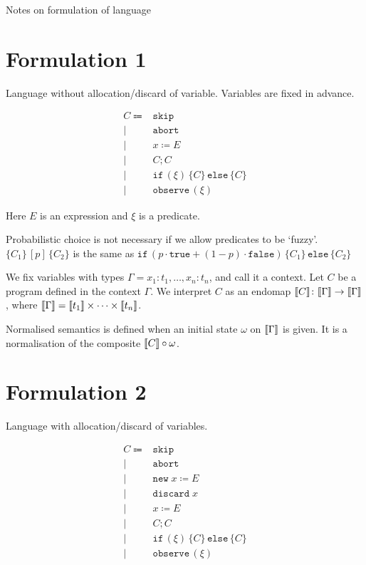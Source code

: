 \documentclass[a4paper]{article}
\newcommand{\Pskip}{\mathtt{skip}}
\newcommand{\Pabort}{\mathtt{abort}}
\newcommand{\Passign}[2]{#1\coloneqq #2}
\newcommand{\Pdiscard}[1]{\mathtt{discard}\; #1}
\newcommand{\Pnewassign}[2]{\mathtt{new}\; #1\coloneqq #2}
\newcommand{\Pseq}[2]{#1; #2}
\newcommand{\Pifthenelse}[3]{\mathtt{if}\,
(#1)\,\{#2\}\,\mathtt{else}\,\{#3\}}
\newcommand{\Pobserve}[1]{\mathtt{observe}\,(#1)}
\newcommand{\Ppchoice}[3]{\{#1\}\,[#2]\,\{#3\}}
\newcommand{\Ptrue}{\mathtt{true}}
\newcommand{\Pfalse}{\mathtt{false}}
\DeclarePairedDelimiter{\sem}{\llbracket}{\rrbracket}
\begin{document}
Notes on formulation of language

\section{Formulation 1}

Language without allocation/discard of variable.
Variables are fixed in advance.

\begin{align*}
C\Coloneqq {}&
\Pskip
\\
\mid {}&
\Pabort
\\
\mid {}&
\Passign{x}{E}
\\
\mid {}&
\Pseq{C}{C}
\\
\mid {}&
\Pifthenelse{\xi}{C}{C}
\\
\mid {}&
\Pobserve{\xi}
\end{align*}

Here $E$ is an expression and $\xi$ is a predicate.

Probabilistic choice is not necessary if we allow predicates to be `fuzzy'.
$\Ppchoice{C_1}{p}{C_2}$
is the same as $\Pifthenelse{p\cdot \Ptrue
+(1-p)\cdot\Pfalse}{C_1}{C_2}$

We fix variables with types $\Gamma = x_1:t_1, \dotsc, x_n:t_n$,
and call it a context.
Let $C$ be a program defined in the context $\Gamma$.
We interpret $C$ as
an endomap $\sem{C}\colon\sem{\Gamma}\to\sem{\Gamma}$,
where $\sem{\Gamma}=\sem{t_1}\times\dotsb\times\sem{t_n}$.

Normalised semantics is defined when an initial state $\omega$
on $\sem{\Gamma}$ is given.
It is a normalisation of the composite $\sem{C}\circ\omega$.

\section{Formulation 2}

Language with allocation/discard of variables.

\begin{align*}
C\Coloneqq {}&
\Pskip
\\
\mid {}&
\Pabort
\\
\mid {}&
\Pnewassign{x}{E}
\\
\mid {}&
\Pdiscard{x}
\\
\mid {}&
\Passign{x}{E}
\\
\mid {}&
\Pseq{C}{C}
\\
\mid {}&
\Pifthenelse{\xi}{C}{C}
\\
\mid {}&
\Pobserve{\xi}
\end{align*}
\end{document}
